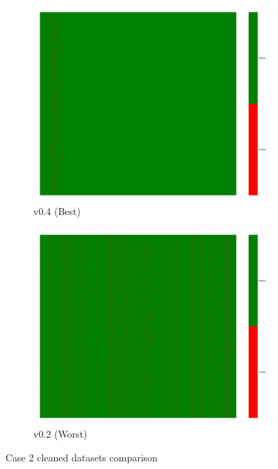 \documentclass[a4paper,12pt]{article}
\begin{document}
\begin{figure}[H]
    \centering
    \begin{subfigure}{0.45\textwidth}
        \includegraphics[width=\linewidth]{case2_v0.4_heatmap_cleaned.png}
        \caption{v0.4 (Best)}
    \end{subfigure}
    \hfill
    \begin{subfigure}{0.45\textwidth}
        \includegraphics[width=\linewidth]{case2_v0.2_heatmap_cleaned.png}
        \caption{v0.2 (Worst)}
    \end{subfigure}
    \caption{Case 2 cleaned datasets comparison}
\end{figure}
\end{document}
